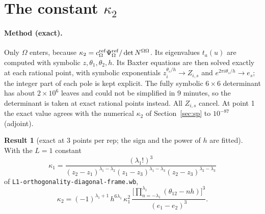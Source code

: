 \documentclass[11pt]{article}
\newcommand{\nb}[1]{\texttt{#1}}
\theoremstyle{definition}
\newtheorem{result}{Result}
\theoremstyle{remark}
\begin{document}
\section{The constant $\kappa_2$}\label{sec:kappa}

\paragraph{Method (exact).}
Only $\Omega$ enters, because $\kappa_2=c^{\rm ref}_\Omega\Psi^{\rm ref}_\Omega/\det N^{\Omega\Omega}$. Its eigenvalues $t_a(u)$ are computed with symbolic $z,\theta_1,\theta_2,h$. Its Baxter equations are then solved exactly at each rational point, with symbolic exponentials $z_i^{\theta_s/h}\to Z_{i,s}$ and $e^{2\pi i\theta_s/h}\to e_s$; the integer part of each pole is kept explicit. The fully symbolic $6\times6$ determinant has about $2\times10^6$ leaves and could not be simplified in 9 minutes, so the determinant is taken at exact rational points instead. All $Z_{i,s}$ cancel. At point 1 the exact value agrees with the numerical $\kappa_2$ of Section~\ref{sec:sp} to $10^{-87}$ (adjoint).

\begin{result}[exact at 3 points per rep; the sign and the power of $h$ are fitted]\label{res:kappa}
With the $L=1$ constant
\begin{equation}
\kappa_1=\frac{(\lambda_1!)^3}{(z_2-z_1)^{\lambda_1-\lambda_2}(z_1-z_3)^{\lambda_1-\lambda_3}(z_2-z_3)^{\lambda_2-\lambda_3}}
\end{equation}
of \nb{L1-orthogonality-diagonal-frame.wb},
\begin{equation}
\kappa_2=(-1)^{\lambda_1+1}\,h^{6\lambda_1}\,\kappa_1^2\,\frac{\Big[\prod_{n=-\lambda_1}^{\lambda_1}(\theta_{12}-nh)\Big]^3}{(e_1-e_2)^3}.
\end{equation}
\end{result}
\end{document}
